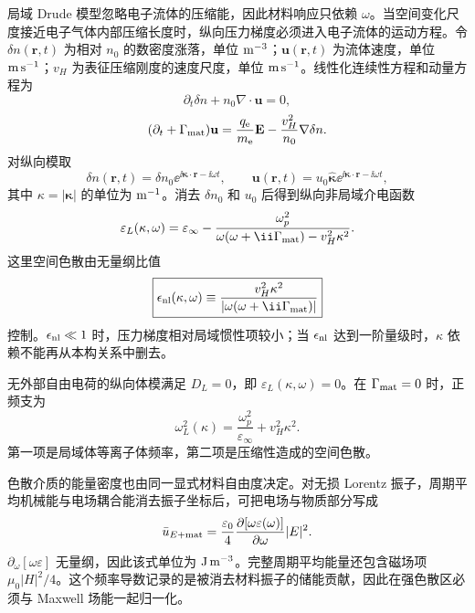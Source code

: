 \begin{exbox}
局域 Drude 模型忽略电子流体的压缩能，因此材料响应只依赖 $\omega$。当空间变化尺度接近电子气体内部压缩长度时，纵向压力梯度必须进入电子流体的运动方程。令 $\delta n(\mathbf r,t)$ 为相对 $n_0$ 的数密度涨落，单位 ${\rm m^{-3}}$；$\mathbf u(\mathbf r,t)$ 为流体速度，单位 ${\rm m\,s^{-1}}$；$v_H$ 为表征压缩刚度的速度尺度，单位 ${\rm m\,s^{-1}}$。线性化连续性方程和动量方程为
\begin{equation*}
\partial_t\delta n+n_0\nabla\cdot\mathbf u=0,
\end{equation*}
\begin{equation*}
(\partial_t+\Gamma_{\rm mat})\mathbf u
=\frac{q_{\mathrm e}}{m_{\mathrm e}}\mathbf E
-\frac{v_H^2}{n_0}\nabla\delta n.
\end{equation*}
对纵向模取
\[
\delta n(\mathbf r,t)=\delta n_0\ee^{\ii\boldsymbol\kappa\cdot\mathbf r-\ii\omega t},\qquad
\mathbf u(\mathbf r,t)=u_0\hat{\boldsymbol\kappa}\ee^{\ii\boldsymbol\kappa\cdot\mathbf r-\ii\omega t},
\]
其中 $\kappa=|\boldsymbol\kappa|$ 的单位为 ${\rm m^{-1}}$。消去 $\delta n_0$ 和 $u_0$ 后得到纵向非局域介电函数
\begin{equation*}
\varepsilon_L(\kappa,\omega)
=\varepsilon_\infty
-\frac{\omega_p^2}
{\omega(\omega+\ii\Gamma_{\rm mat})-v_H^2\kappa^2}.
\end{equation*}
这里空间色散由无量纲比值
\begin{equation}
\boxed{
\epsilon_{\rm nl}(\kappa,\omega)
\equiv
\frac{v_H^2\kappa^2}
{|\omega(\omega+\ii\Gamma_{\rm mat})|}}
\label{eq:hydrodynamic_nonlocal_control}
\end{equation}
控制。$\epsilon_{\rm nl}\ll1$ 时，压力梯度相对局域惯性项较小；当 $\epsilon_{\rm nl}$ 达到一阶量级时，$\kappa$ 依赖不能再从本构关系中删去。

无外部自由电荷的纵向体模满足 $D_L=0$，即 $\varepsilon_L(\kappa,\omega)=0$。在 $\Gamma_{\rm mat}=0$ 时，正频支为
\begin{equation}
\boxed{
\omega_L^2(\kappa)
=\frac{\omega_p^2}{\varepsilon_\infty}
+v_H^2\kappa^2.}
\label{eq:hydrodynamic_bulk_longitudinal_dispersion}
\end{equation}
第一项是局域体等离子体频率，第二项是压缩性造成的空间色散。

色散介质的能量密度也由同一显式材料自由度决定。对无损 Lorentz 振子，周期平均机械能与电场耦合能消去振子坐标后，可把电场与物质部分写成
\begin{equation*}
\bar u_{E+{\rm mat}}
=\frac{\varepsilon_0}{4}
\frac{\partial[\omega\varepsilon(\omega)]}{\partial\omega}
|E|^2.
\end{equation*}
$\partial_\omega[\omega\varepsilon]$ 无量纲，因此该式单位为 ${\rm J\,m^{-3}}$。完整周期平均能量还包含磁场项 $\mu_0|H|^2/4$。这个频率导数记录的是被消去材料振子的储能贡献，因此在强色散区必须与 Maxwell 场能一起归一化。


\end{exbox}
